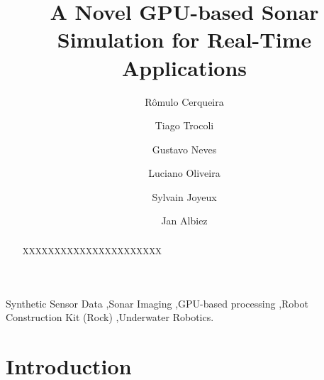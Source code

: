 \documentclass[final,5p,times]{elsarticle}
\begin{document}
\begin{frontmatter}



\title{A Novel GPU-based Sonar Simulation for Real-Time Applications}

\author[senai,ufba]{Rômulo Cerqueira}
\author[senai]{Tiago Trocoli}
\author[senai]{Gustavo Neves}
\author[ufba]{Luciano Oliveira}
\author[senai]{Sylvain Joyeux}
\author[senai,dfki]{Jan Albiez}

\address[senai]{Brazilian Institute of Robotics, SENAI CIMATEC, Salvador, Bahia, Brazil}
\address[ufba]{Intelligent Vision Research Lab, Federal University of Bahia, Salvador, Bahia, Brazil}
\address[dfki]{Robotics Innovation Center, DFKI GmbH, Bremen, Germany}

\begin{abstract}
XXXXXXXXXXXXXXXXXXXXXX
\end{abstract}

\begin{keyword}
Synthetic Sensor Data \sep Sonar Imaging  \sep GPU-based processing \sep Robot Construction Kit (Rock) \sep Underwater Robotics.

\end{keyword}

\end{frontmatter}

\linenumbers

\section{Introduction}
\label{}
\end{document}
